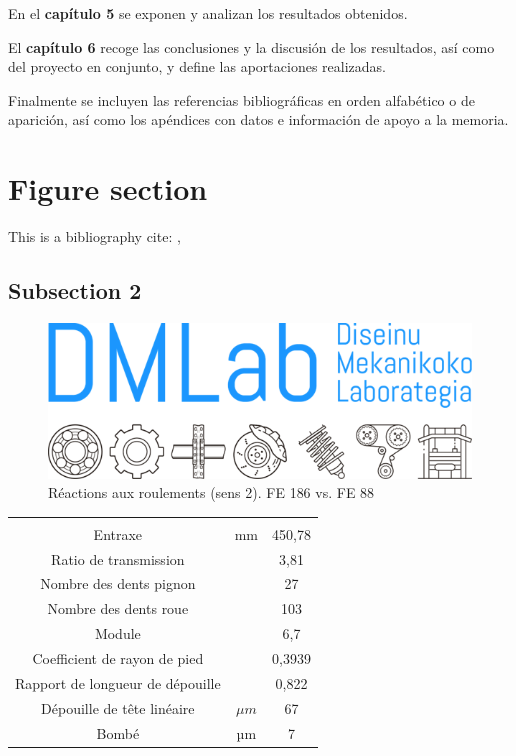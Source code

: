 En el \textbf{capítulo 5} se exponen y analizan los resultados obtenidos.

El \textbf{capítulo 6} recoge las conclusiones y la discusión de los resultados, así como del proyecto en conjunto, y define las aportaciones realizadas.

Finalmente se incluyen las referencias bibliográficas en orden alfabético o de aparición, así como los apéndices con datos e información de apoyo a la memoria.

\section{Figure section}

\blindtext
\blindtext
This is a bibliography cite: \cite{Silvers2010ASplines}, \cite{Chander1983AbnormalStudy}

\blindtext
\blindtext
\subsection{Subsection 2}
\blindtext
\begin{figure}[!htb]\centering	
\includegraphics[width=0.69\linewidth]{Figures/Logo_DMLab2.png}
    \caption{Réactions aux roulements (sens 2). FE 186 vs. FE 88}
    \label{reactf_FE88}
\end{figure} 

\blindtext

\begin{table}[h!]
\centering
{}
  \begin{tabular}{ c c c }
  \hline\hline\\
  Entraxe & mm & 450,78\\
  Ratio de transmission & & 3,81\\
  Nombre des dents pignon & & 27\\
  Nombre des dents roue & & 103\\
  Module & & 6,7\\
  Coefficient de rayon de pied & & 0,3939 \\[1ex]
  \hline
  Rapport de longueur de dépouille & & 0,822\\
  Dépouille de tête linéaire & $\mu m$ & 67\\
  Bombé & µm & 7\\[1ex]
  \hline\hline
  \end{tabular}    
\label{carac_M7_2}
\end{table}

